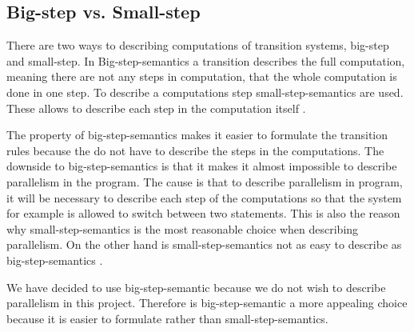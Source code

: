 \subsection{Big-step vs. Small-step}
\label{sec:BvsS}
There are two ways to describing computations of transition systems, big-step and small-step. In Big-step-semantics a transition describes the full computation, meaning there are not any steps in computation, that the whole computation is done in one step. To describe a computations step small-step-semantics are used. These allows to describe each step in the computation itself \citep{HHTree}.

The property of big-step-semantics makes it easier to formulate the transition rules because the do not have to describe the steps in the computations. The downside to big-step-semantics is that it makes it almost impossible to describe parallelism in the program. The cause is that to describe parallelism in program, it will be necessary to describe each step of the computations so that the system for example is allowed to switch between two statements. This is also the reason why small-step-semantics is the most reasonable choice when describing parallelism. On the other hand is small-step-semantics not as easy to describe as big-step-semantics \citep{HHTree}.

We have decided to use big-step-semantic because we do not wish to describe parallelism in this project. Therefore is big-step-semantic a more appealing choice because it is easier to formulate rather than small-step-semantics.
